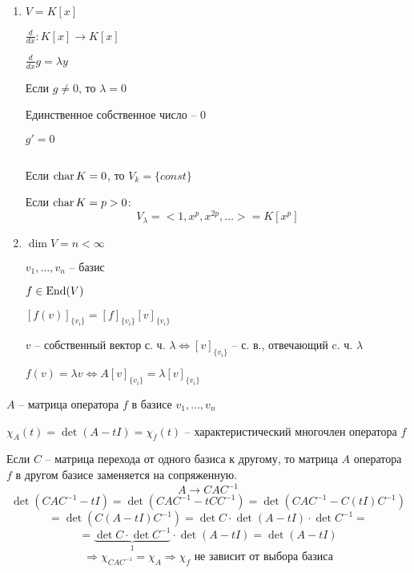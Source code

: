    \begin{illustration*}
        $ $
        \begin{enumerate}
            \item $V = K[x]$
                \par $\frac{d}{dx} : K[x] \rightarrow K[x]$
                \par $\frac{d}{dx} g = \lambda y$
                \par Если $g \not= 0$, то $\lambda = 0$
                \par Единственное собственное число -- $0$
                \par $g' = 0$
                \par $ $
                \par Если $\operatorname{char} K = 0$, то $V_k = \{const\}$
                \par Если $\operatorname{char} K = p > 0$:
                \[
                    V_\lambda = <1, x^p, x^{2p}, \dots> = K[x^p]    
                \]
            \item $\dim V = n < \infty$
                \par $v_1, \dots, v_n$ -- базис
                \par $f \in \operatorname{End}(V)$
                \par $[f(v)]_{\{v_i\}} = [f]_{\{v_i\}} [v]_{\{v_i\}}$
                \par $v$ -- собственный вектор с. ч. $\lambda \Leftrightarrow [v]_{\{v_i\}}$ -- с. в., отвечающий c. ч. $\lambda$
                \par $f(v) = \lambda v \Leftrightarrow A[v]_{\{v_i\}} = \lambda[v]_{\{v_i\}}$
        \end{enumerate}
    \end{illustration*}

    \par $A$ -- матрица оператора $f$ в базисе $v_1, \dots, v_n$
    \par $\chi_A(t) = \det(A - tI) = \chi_f(t)$ -- характеристический многочлен оператора $f$
    \par Если $C$ -- матрица перехода от одного базиса к другому, то матрица $A$ оператора $f$ в другом
    базисе заменяется на сопряженную.
    \[
        A \rightarrow CAC^{-1}    
    \]
    \[
        \det(CAC^{-1} - tI) = \det(CAC^{-1} - tCC^{-1}) = \det(CAC^{-1} - C(tI)C^{-1})    
    \]
    \[
        = \det(C(A - tI)C^{-1}) = \det C \cdot \det (A-tI) \cdot \det C^{-1} =
    \]
    \[
        = \underbrace{\det C \cdot \det C^{-1}}_{1} \cdot \det(A - tI) = \det(A - tI)
    \]
    \[
        \Rightarrow \chi_{CAC^{-1}} = \chi_A \Rightarrow \chi_f \text{ не зависит от выбора базиса}
    \]

